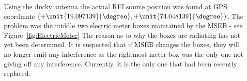 \documentclass[a4paper,12pt]{article}
\begin{document}
                                                                                                                                                                                                                                                                                                                                                                                                                                                                                                                                                                                                                                                                                                                                                                                                                                                                                                                                                                                                                                                                                                                                                                                              Using the ducky antenna the actual RFI source position was found at GPS coordinate $(+\unit{19.097139}{\degree},+\unit{74.048139}{\degree})$. The problem was the middle two electric meter boxes maintained by the MSEB - see  Figure~\ref{fig:ElectricMeter} The reason as to why the boxes are radiating has not yet been determined. It is suspected that if MSEB changes the boxes, they will no longer emit any interference as the rightmost meter box was the only one not giving off any interference. Currently, it is the only one that had been recently replaced.
\end{document}
